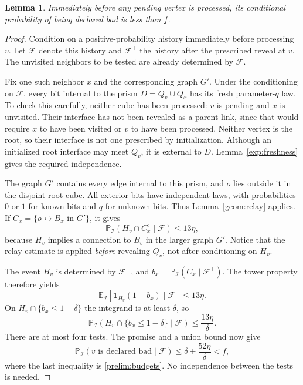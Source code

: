 \documentclass[11pt]{article}
\newtheorem{lemma}[theorem]{Lemma}
\theoremstyle{definition}
\theoremstyle{remark}
\numberwithin{equation}{section}
\begin{document}
\begin{lemma}
\label{exp:conditional-bad}
Immediately before any pending vertex is processed, its conditional
probability of being declared bad is less than $f$.
\end{lemma}

\begin{proof}
Condition on a positive-probability history immediately before
processing $v$. Let $\mathcal F$ denote this history and
$\mathcal F^+$ the history after the prescribed reveal at $v$.
The unvisited neighbors to be tested are already determined by
$\mathcal F$.

Fix one such neighbor $x$ and the corresponding graph $G'$. Under the
conditioning on $\mathcal F$, every bit internal to the prism
$D=Q_v\cup Q_x$ has its fresh parameter-$q$ law. To check this carefully,
neither cube has been processed: $v$ is pending and $x$ is unvisited.
Their interface has not been revealed as a parent link, since that
would require $x$ to have been visited or $v$ to have been processed.
Neither vertex is the root, so their interface is not one prescribed
by initialization. Although an initialized root interface may meet
$Q_v$, it is external to $D$. Lemma~\ref{exp:freshness} gives the
required independence.

The graph $G'$ contains every edge internal to this prism, and $o$ lies
outside it in the disjoint root cube. All exterior bits have independent
laws, with probabilities $0$ or $1$ for known bits and $q$ for unknown
bits. Thus Lemma~\ref{geom:relay} applies. If
$C_x=\{o\leftrightarrow B_x\text{ in }G'\}$, it gives
\[
 \mathbb P_{\mathcal I}(H_v\cap C_x^{\mathrm c}\mid\mathcal F)
 \le 13\eta,
\]
because $H_v$ implies a connection to $B_v$ in the larger graph $G'$.
Notice that the relay estimate is applied \emph{before} revealing
$Q_v$, not after conditioning on $H_v$.

The event $H_v$ is determined by $\mathcal F^+$, and
$b_x=\mathbb P_{\mathcal I}(C_x\mid\mathcal F^+)$. The tower property
therefore yields
\[
 \mathbb E_{\mathcal I}
   [\mathbf 1_{H_v}(1-b_x)\mid\mathcal F]\le13\eta.
\]
On $H_v\cap\{b_x\le1-\delta\}$ the integrand is at least $\delta$,
so
\[
 \mathbb P_{\mathcal I}
   (H_v\cap\{b_x\le1-\delta\}\mid\mathcal F)
 \le\frac{13\eta}{\delta}.
\]
There are at most four tests. The promise and a union bound now give
\[
 \mathbb P_{\mathcal I}(v\text{ is declared bad}\mid\mathcal F)
 \le\delta+\frac{52\eta}{\delta}<f,
\]
where the last inequality is \eqref{prelim:budgets}. No independence
between the tests is needed.
\end{proof}
\end{document}

